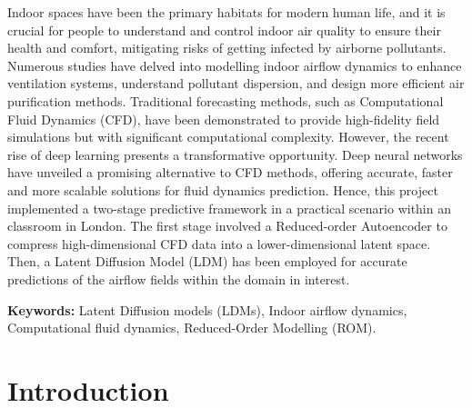 \documentclass[final-report]{article-template}
\renewenvironment{abstract}{%
    \begin{center}%
        {\bfseries \Large\abstractname\vspace{-0.5em}}%
    \end{center}%
    \quotation
}{%
    \endquotation
}
\begin{document}
\newpage
{}
\setcounter{page}{1}
\begin{abstract}
\noindent Indoor spaces have been the primary habitats for modern human life, and it is crucial for people to understand and control indoor air quality to ensure their health and comfort, mitigating risks of getting infected by airborne pollutants. Numerous studies have delved into modelling indoor airflow dynamics to enhance ventilation systems, understand pollutant dispersion, and design more efficient air purification methods. Traditional forecasting methods, such as Computational Fluid Dynamics (CFD), have been demonstrated to provide high-fidelity field simulations but with significant computational complexity. However, the recent rise of deep learning presents a transformative opportunity. Deep neural networks have unveiled a promising alternative to CFD methods, offering accurate, faster and more scalable solutions for fluid dynamics prediction. Hence, this project implemented a two-stage predictive framework in a practical scenario within an classroom in London. The first stage involved a Reduced-order Autoencoder to compress high-dimensional CFD data into a lower-dimensional latent space. Then, a Latent Diffusion Model (LDM) has been employed for accurate predictions of the airflow fields within the domain in interest.

\noindent \textbf{Keywords:} Latent Diffusion models (LDMs), Indoor airflow dynamics, Computational fluid dynamics, Reduced-Order Modelling (ROM).
\end{abstract}

\setcounter{page}{1}
\section{Introduction}\label{intro}
\end{document}
